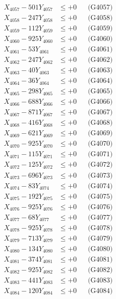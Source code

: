 \documentclass[a4paper,10pt]{article}
\begin{document}
{\begin{align}
X_{4057} - 501Y_{4057} &\leq +0 && \text{(G4057)} \\
X_{4058} - 247Y_{4058} &\leq +0 && \text{(G4058)} \\
X_{4059} - 112Y_{4059} &\leq +0 && \text{(G4059)} \\
X_{4060} - 925Y_{4060} &\leq +0 && \text{(G4060)} \\
\allowbreak
X_{4061} - 53Y_{4061} &\leq +0 && \text{(G4061)} \\
X_{4062} - 247Y_{4062} &\leq +0 && \text{(G4062)} \\
X_{4063} - 40Y_{4063} &\leq +0 && \text{(G4063)} \\
X_{4064} - 36Y_{4064} &\leq +0 && \text{(G4064)} \\
X_{4065} - 298Y_{4065} &\leq +0 && \text{(G4065)} \\
X_{4066} - 688Y_{4066} &\leq +0 && \text{(G4066)} \\
X_{4067} - 871Y_{4067} &\leq +0 && \text{(G4067)} \\
X_{4068} - 416Y_{4068} &\leq +0 && \text{(G4068)} \\
X_{4069} - 621Y_{4069} &\leq +0 && \text{(G4069)} \\
X_{4070} - 925Y_{4070} &\leq +0 && \text{(G4070)} \\
\allowbreak
X_{4071} - 115Y_{4071} &\leq +0 && \text{(G4071)} \\
X_{4072} - 125Y_{4072} &\leq +0 && \text{(G4072)} \\
X_{4073} - 696Y_{4073} &\leq +0 && \text{(G4073)} \\
X_{4074} - 83Y_{4074} &\leq +0 && \text{(G4074)} \\
X_{4075} - 192Y_{4075} &\leq +0 && \text{(G4075)} \\
X_{4076} - 925Y_{4076} &\leq +0 && \text{(G4076)} \\
X_{4077} - 68Y_{4077} &\leq +0 && \text{(G4077)} \\
X_{4078} - 925Y_{4078} &\leq +0 && \text{(G4078)} \\
X_{4079} - 713Y_{4079} &\leq +0 && \text{(G4079)} \\
X_{4080} - 134Y_{4080} &\leq +0 && \text{(G4080)} \\
\allowbreak
X_{4081} - 374Y_{4081} &\leq +0 && \text{(G4081)} \\
X_{4082} - 925Y_{4082} &\leq +0 && \text{(G4082)} \\
X_{4083} - 441Y_{4083} &\leq +0 && \text{(G4083)} \\
X_{4084} - 120Y_{4084} &\leq +0 && \text{(G4084)} \\

\end{align}}
\end{document}
